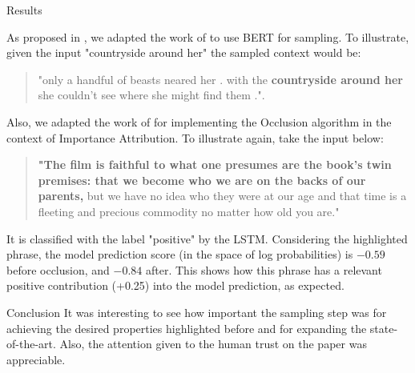 \documentclass[final]{beamer}
\newlength{\onecolwid}
\begin{document}
\begin{frame}[t]
\begin{columns}[t]
\begin{column}{\onecolwid}
\begin{block}{Results}

As proposed in \cite{jin2020towards}, we adapted the work of \cite{wang2019bert} to use BERT for sampling. To illustrate, given the input "countryside around her" the sampled context would be: 

\begin{quote}
    "only a handful of beasts neared her . with the \textbf{countryside around her} she couldn't see where she might find them .". 
\end{quote}



Also, we adapted the work of \cite{clairett2018} for implementing the Occlusion algorithm in the context of Importance Attribution. To illustrate again, take the input below:

\begin{quote}
    \textbf{"The film is faithful to what one presumes are the book's twin premises: that we become who we are on the backs of our parents,} but we have no idea who they were at our age and that time is a fleeting and precious commodity no matter how old you are."
\end{quote}

It is classified with the label "positive" by the LSTM. Considering the highlighted phrase, the model prediction score (in the space of log probabilities) is $-0.59$ before occlusion, and $-0.84$ after. This shows how this phrase has a relevant positive contribution (+0.25) into the model prediction, as expected.


\end{block}

\begin{block}{Conclusion}
It was interesting to see how important the sampling step was for achieving the desired properties highlighted before and for expanding the state-of-the-art. Also, the attention given to the human trust on the paper was appreciable. 



\end{block}
\end{column}
\end{columns}
\end{frame}
\end{document}

